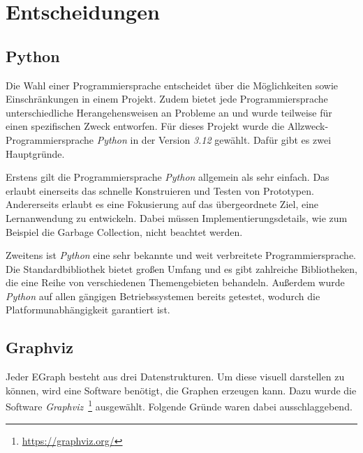 \section{Entscheidungen}\label{sec:entscheidungen}

\subsection{Python}

Die Wahl einer Programmiersprache entscheidet über die Möglichkeiten sowie Einschränkungen in einem Projekt.
Zudem bietet jede Programmiersprache unterschiedliche Herangehensweisen an Probleme an und wurde teilweise für einen spezifischen Zweck entworfen.
Für dieses Projekt wurde die Allzweck-Programmiersprache \textit{Python} in der Version \textit{3.12} gewählt.
Dafür gibt es zwei Hauptgründe. 

\noindent Erstens gilt die Programmiersprache \textit{Python} allgemein als sehr einfach. 
Das erlaubt einerseits das schnelle Konstruieren und Testen von Prototypen. 
Andererseits erlaubt es eine Fokusierung auf das übergeordnete Ziel, eine Lernanwendung zu entwickeln. Dabei müssen Implementierungsdetails, wie zum Beispiel
die Garbage Collection, nicht beachtet werden.

Zweitens ist \textit{Python} eine sehr bekannte und weit verbreitete Programmiersprache. 
Die Standardbibliothek bietet großen Umfang und es gibt zahlreiche Bibliotheken, die eine Reihe von verschiedenen Themengebieten behandeln.
Außerdem wurde \textit{Python} auf allen gängigen Betriebssystemen bereits getestet, wodurch die Platformunabhängigkeit garantiert ist.

\subsection{Graphviz}

Jeder EGraph besteht aus drei Datenstrukturen. Um diese visuell darstellen zu können, wird eine Software benötigt, die Graphen erzeugen kann.
Dazu wurde die Software \textit{Graphviz}~\footnote{\hspace{1.5mm}\url{https://graphviz.org/}} ausgewählt. Folgende Gründe waren dabei ausschlaggebend.

